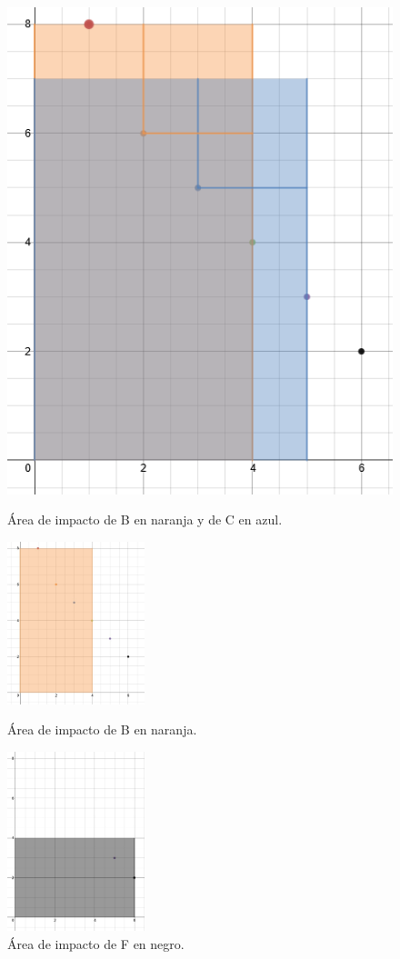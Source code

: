 \documentclass[10pt,a4paper]{article}
\begin{document}
\begin{figure}[h]
\centering
\begin{minipage}{.5\textwidth}
  \centering
  \includegraphics[width=.4\linewidth]{EjemploArea4}
  \caption{Área de impacto de B en naranja y de C en azul.}
  \label{fig:test1}
\end{minipage}%
\begin{minipage}{.5\textwidth}
  \centering
  \includegraphics[width=4cm]{EjemploArea5}
  \caption{Área de impacto de B en naranja.}
  \label{fig:test2}
\end{minipage}

\begin{minipage}{.5\textwidth}
  \centering
  \includegraphics[width=4cm]{EjemploArea6}
  \caption{Área de impacto de F en negro.}
  \label{fig:test2}
\end{minipage}

\end{figure}
\end{document}

